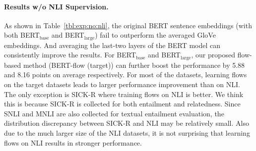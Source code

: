 \documentclass[11pt,a4paper]{article}
\newcommand*{\mathcolor}{}
\def\mathcolor#1#{\mathcoloraux{#1}}
\newcommand*{\mathcoloraux}[3]{\protect\leavevmode
  \begingroup
    \color#1{#2}#3\endgroup
}
\begin{document}
\begin{table*}[ht]
\begin{center}
{\begin{tabular}{l llllllll}
\bottomrule
\end{tabular}
}
\caption{
Experimental results on semantic textual similarity \textit{with} NLI supervision. Note that our flows are still learned in a \textit{unsupervised} way. 
InferSent~\citep{conneau-EtAl:2017:EMNLP2017} is a siamese LSTM train on NLI, Universal Sentence Encoder (USE)~\citep{cer2018universal} replace the LSTM with a Transformer and SBERT~\cite{reimers2019sentence} further use BERT.
We report the Spearman's rank correlation between the cosine similarity of sentence embeddings and the gold labels on multiple datasets. Numbers are reported as $\rho \times 100$. $\mathcolor{green}{\uparrow}$ denotes outperformance over its BERT baseline and $\mathcolor{red}{\downarrow}$ denotes underperformance. Our proposed BERT-flow (i.e., the ``BERT-NLI-flow'' in this table) method achieves the best scores. Note that our BERT-flow use \textit{-last2avg} as default setting. $*$: Use NLI corpus for the unsupervised training of flow; supervision labels of NLI are NOT visible.}
\label{tbl:exp:nli}
\end{center}
\vspace{-10pt}
\end{table*}

\paragraph{Results w/o NLI Supervision. } 
As shown in Table~\ref{tbl:exp:no:nli}, the original BERT sentence embeddings (with both BERT$_{\text{base}}$ and BERT$_{\text{large}}$) fail to outperform the averaged GloVe embeddings. 
And averaging the last-two layers of the BERT model can consistently improve the results. For BERT$_{\text{base}}$ and BERT$_{\text{large}}$, our proposed flow-based method (BERT-flow (target)) can further boost the performance by 5.88 and 8.16 points on average respectively.
For most of the datasets, learning flows on the target datasets leads to larger performance improvement than on NLI. The only exception is SICK-R where training flows on NLI is better. We think this is because SICK-R is collected for both entailment and relatedness. 
Since SNLI and MNLI are also collected for textual entailment evaluation, the distribution discrepancy between SICK-R and NLI may be relatively small. Also due to the much larger size of the NLI datasets, it is not surprising that learning flows on NLI results in stronger performance.
\end{document}

